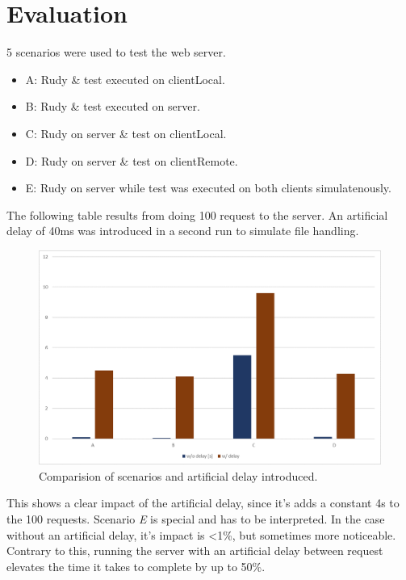 \documentclass[a4paper, 11pt]{article}
\begin{document}
\section{Evaluation}

5 scenarios were used to test the web server.
\begin{itemize}
    \item A: Rudy \& test executed on clientLocal.
    \item B: Rudy \& test executed on server.
    \item C: Rudy on server \& test on clientLocal.
    \item D: Rudy on server \& test on clientRemote.
    \item E: Rudy on server while test was executed on both clients simulatenously.
\end{itemize}

The following table results from doing 100 request to the server.
An artificial delay of 40ms was introduced in a second run to simulate file handling.
\begin{figure}[h]
  \begin{center}
    \includegraphics[width=\textwidth,height=\textheight,keepaspectratio]{results1.png}
    \caption{Comparision of scenarios and artificial delay introduced.}
    \label{fig:results}
  \end{center}
\end{figure}


This shows a clear impact of the artificial delay, since it's adds a constant 4s to the 100 requests.
Scenario \textit{E} is special and has to be interpreted.
In the case without an artificial delay, it's impact is \textless1\%, but sometimes more noticeable.
Contrary to this, running the server with an artificial delay between request elevates the time it takes to complete by up to 50\%.
\end{document}
